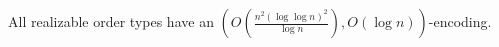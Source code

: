\begin{contribution}[label=thm:realizable,restate=TheoremGPTRealizable]
  All realizable order types have an
  \((O(\frac{n^2 {(\log \log n)}^2}{\log n}), O(\log n))\)-encoding.
\end{contribution}
